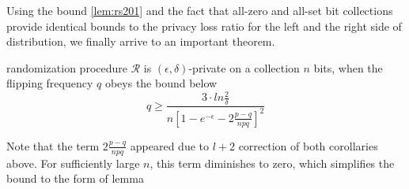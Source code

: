 \documentclass[11pt]{article}
\newcommand{\cR}{\mathcal{R}}
\begin{document}
Using the bound \eqref{lem:rs201} and the fact that all-zero and all-set bit collections provide identical bounds to the privacy loss ratio for the left and the right side of distribution, we finally arrive to an important theorem.
\begin{prop}
randomization procedure $\cR$ is $(\epsilon, \delta)$-private on a collection $n$ bits, when the flipping frequency $q$ obeys the bound below
\begin{equation} \label{eq:fullbound}
q \ge  \frac { 3 \cdot ln\frac{2}{\delta}} { n \left [ 1 - e^{-\epsilon} - 2 \frac{p-q}{npq} \right ]^2 }
\end{equation}
\end{prop}
Note that the term $2 \frac{p-q}{npq}$ appeared due to $l+2$ correction of both corollaries above.  For sufficiently large $n$, this term diminishes to zero, which simplifies the bound to the form of lemma  
\end{document}
